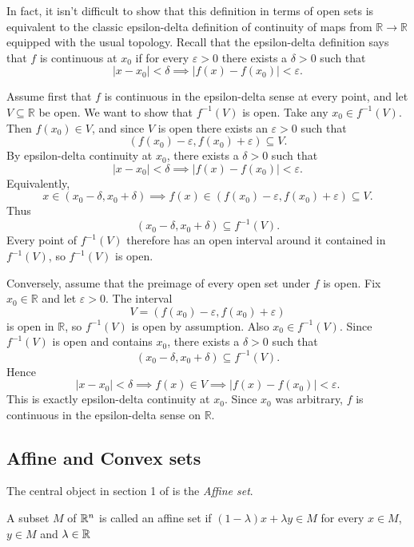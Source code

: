 

In fact, it isn't difficult to show that this definition in terms of open sets is equivalent to the classic epsilon-delta definition of continuity of maps from $\mathbb{R} \to \mathbb{R}$ equipped with the usual topology.
Recall that the epsilon-delta definition says that $f$ is continuous at $x_0$ if for every $\varepsilon > 0$ there exists a $\delta > 0$ such that
\[
    |x - x_0| < \delta \implies |f(x) - f(x_0)| < \varepsilon.
\]

Assume first that $f$ is continuous in the epsilon-delta sense at every point, and let $V \subseteq \mathbb{R}$ be open.
We want to show that $f^{-1}(V)$ is open.
Take any $x_0 \in f^{-1}(V)$.
Then $f(x_0) \in V$, and since $V$ is open there exists an $\varepsilon > 0$ such that
\[
    (f(x_0) - \varepsilon, f(x_0) + \varepsilon) \subseteq V.
\]
By epsilon-delta continuity at $x_0$, there exists a $\delta > 0$ such that
\[
    |x - x_0| < \delta \implies |f(x) - f(x_0)| < \varepsilon.
\]
Equivalently,
\[
    x \in (x_0 - \delta, x_0 + \delta)
    \implies
    f(x) \in (f(x_0) - \varepsilon, f(x_0) + \varepsilon) \subseteq V.
\]
Thus
\[
    (x_0 - \delta, x_0 + \delta) \subseteq f^{-1}(V).
\]
Every point of $f^{-1}(V)$ therefore has an open interval around it contained in $f^{-1}(V)$, so $f^{-1}(V)$ is open.

Conversely, assume that the preimage of every open set under $f$ is open.
Fix $x_0 \in \mathbb{R}$ and let $\varepsilon > 0$.
The interval
\[
    V = (f(x_0) - \varepsilon, f(x_0) + \varepsilon)
\]
is open in $\mathbb{R}$, so $f^{-1}(V)$ is open by assumption.
Also $x_0 \in f^{-1}(V)$.
Since $f^{-1}(V)$ is open and contains $x_0$, there exists a $\delta > 0$ such that
\[
    (x_0 - \delta, x_0 + \delta) \subseteq f^{-1}(V).
\]
Hence
\[
    |x - x_0| < \delta
    \implies
    f(x) \in V
    \implies
    |f(x) - f(x_0)| < \varepsilon.
\]
This is exactly epsilon-delta continuity at $x_0$.
Since $x_0$ was arbitrary, $f$ is continuous in the epsilon-delta sense on $\mathbb{R}$.

\subsection{Affine and Convex sets}

The central object in section 1 of \cite{rockafellar-1970a} is the \textit{Affine set}.
\begin{Def}\cite[p.~3]{rockafellar-1970a}
    A subset $M$ of $\mathbb{R}^n$ is called an affine set if $(1 - \lambda)x + \lambda y \in M$ for every $x \in M$, $y \in M$ and $\lambda \in \mathbb{R}$
    \label{def:affine-set}
\end{Def}


